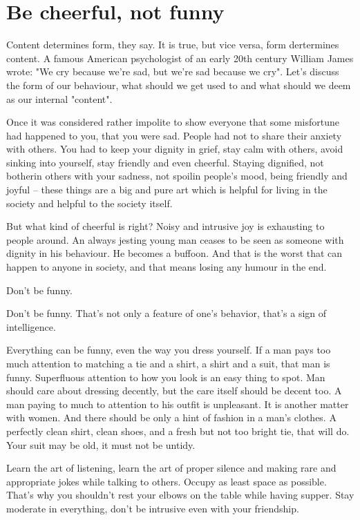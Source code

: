 \chapter{Be cheerful, not funny}

Content determines form, they say. It is true, but vice versa, form dertermines content. A famous American psychologist of an early 20th century William James wrote: "We cry because we're sad, but we're sad because we cry". Let's discuss the form of our behaviour, what should we get used to and what should we deem as our internal "content".

Once it was considered rather impolite to show everyone that some misfortune had happened to you, that you were sad. People had not to share their anxiety with others. You had to keep your dignity in grief, stay calm with others, avoid sinking into yourself, stay friendly and even cheerful. Staying dignified, not botherin others with your sadness, not spoilin people's mood, being friendly and joyful -- these things are a big and pure art which is helpful for living in the society and helpful to the society itself.

But what kind of cheerful is right? Noisy and intrusive joy is exhausting to people around. An always jesting young man ceases to be seen as someone with dignity in his behaviour. He becomes a buffoon. And that is the worst that can happen to anyone in society, and that means losing any humour in the end.

Don't be funny.

Don't be funny. That's not only a feature of one's behavior, that's a sign of intelligence.

Everything can be funny, even the way you dress yourself. If a man pays too much attention to matching a tie and a shirt, a shirt and a suit, that man is funny. Superfluous attention to how you look is an easy thing to spot. Man should care about dressing decently, but the care itself should be decent too. A man paying to much to attention to his outfit is unpleasant. It is another matter with women. And there should be only a hint of fashion in a man's clothes. A perfectly clean shirt, clean shoes, and a fresh but not too bright tie, that will do. Your suit may be old, it must not be untidy.

Learn the art of listening, learn the art of proper silence and making rare and appropriate jokes while talking to others. Occupy as least space as possible. That's why you shouldn't rest your elbows on the table while having supper. Stay moderate in everything, don't be intrusive even with your friendship.


